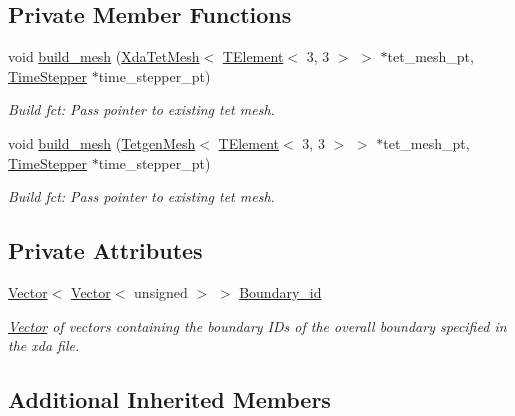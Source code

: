 \subsection*{Private Member Functions}
\begin{DoxyCompactItemize}
\item 
void \hyperlink{classoomph_1_1BrickFromTetMesh_a9b81e29d3b000f02764bf367fa762bfb}{build\+\_\+mesh} (\hyperlink{classoomph_1_1XdaTetMesh}{Xda\+Tet\+Mesh}$<$ \hyperlink{classoomph_1_1TElement}{T\+Element}$<$ 3, 3 $>$ $>$ $\ast$tet\+\_\+mesh\+\_\+pt, \hyperlink{classoomph_1_1TimeStepper}{Time\+Stepper} $\ast$time\+\_\+stepper\+\_\+pt)
\begin{DoxyCompactList}\small\item\em Build fct\+: Pass pointer to existing tet mesh. \end{DoxyCompactList}\item 
void \hyperlink{classoomph_1_1BrickFromTetMesh_afd36d1606f796e926c61b1112b3b6117}{build\+\_\+mesh} (\hyperlink{classoomph_1_1TetgenMesh}{Tetgen\+Mesh}$<$ \hyperlink{classoomph_1_1TElement}{T\+Element}$<$ 3, 3 $>$ $>$ $\ast$tet\+\_\+mesh\+\_\+pt, \hyperlink{classoomph_1_1TimeStepper}{Time\+Stepper} $\ast$time\+\_\+stepper\+\_\+pt)
\begin{DoxyCompactList}\small\item\em Build fct\+: Pass pointer to existing tet mesh. \end{DoxyCompactList}\end{DoxyCompactItemize}
\subsection*{Private Attributes}
\begin{DoxyCompactItemize}
\item 
\hyperlink{classoomph_1_1Vector}{Vector}$<$ \hyperlink{classoomph_1_1Vector}{Vector}$<$ unsigned $>$ $>$ \hyperlink{classoomph_1_1BrickFromTetMesh_a0f6a4b80993ee015038c36ff1aa5556f}{Boundary\+\_\+id}
\begin{DoxyCompactList}\small\item\em \hyperlink{classoomph_1_1Vector}{Vector} of vectors containing the boundary I\+Ds of the overall boundary specified in the xda file. \end{DoxyCompactList}\end{DoxyCompactItemize}
\subsection*{Additional Inherited Members}


